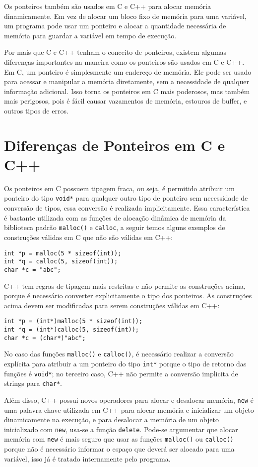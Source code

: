 \documentclass[12pt]{article}
\begin{document}
Os ponteiros também são usados em C e C++ para alocar memória dinamicamente. Em vez de alocar um bloco fixo de memória para uma variável, um programa pode usar um ponteiro e alocar a quantidade necessária de memória para guardar a variável em tempo de execução.

Por mais que C e C++ tenham o conceito de ponteiros, existem algumas diferenças importantes na maneira como os ponteiros são usados em C e C++. Em C, um ponteiro é simplesmente um endereço de memória. Ele pode ser usado para acessar e manipular a memória diretamente, sem a necessidade de qualquer informação adicional. Isso torna os ponteiros em C mais poderosos, mas também mais perigosos, pois é fácil causar vazamentos de memória, estouros de buffer, e outros tipos de erros.

\section{Diferenças de Ponteiros em C e C++}

Os ponteiros em C possuem tipagem fraca, ou seja, é permitido atribuir um ponteiro do tipo \texttt{void*} para qualquer outro tipo de ponteiro sem necessidade de conversão de tipos, essa conversão é realizada implicitamente. Essa característica é bastante utilizada com as funções de alocação dinâmica de memória da biblioteca padrão \texttt{malloc()} e \texttt{calloc}, a seguir temos alguns exemplos de construções válidas em C que não são válidas em C++:
\begin{verbatim}
int *p = malloc(5 * sizeof(int));
int *q = calloc(5, sizeof(int));
char *c = "abc";
\end{verbatim}

C++ tem regras de tipagem mais restritas e não permite as construções acima, porque é necessário converter explicitamente o tipo dos ponteiros. As construções acima devem ser modificadas para serem construções válidas em C++:
\begin{verbatim}
int *p = (int*)malloc(5 * sizeof(int));
int *q = (int*)calloc(5, sizeof(int));
char *c = (char*)"abc";
\end{verbatim}

No caso das funções \texttt{malloc()} e \texttt{calloc()}, é necessário realizar a conversão explícita para atribuir a um ponteiro do tipo \texttt{int*} porque o tipo de retorno das funções é \texttt{void*}; no terceiro caso, C++ não permite a conversão implicita de strings para \texttt{char*}.

Além disso, C++ possui novos operadores para alocar e desalocar memória, \texttt{new} é uma palavra-chave utilizada em C++ para alocar memória e inicializar um objeto dinamicamente na execução, e para desalocar a memória de um objeto inicializado com \texttt{new}, usa-se a função \texttt{delete}. Pode-se argumentar que alocar memória com \texttt{new} é mais seguro que usar as funções \texttt{malloc()} ou \texttt{calloc()} porque não é necessário informar o espaço que deverá ser alocado para uma variável, isso já é tratado internamente pelo programa.
\end{document}

